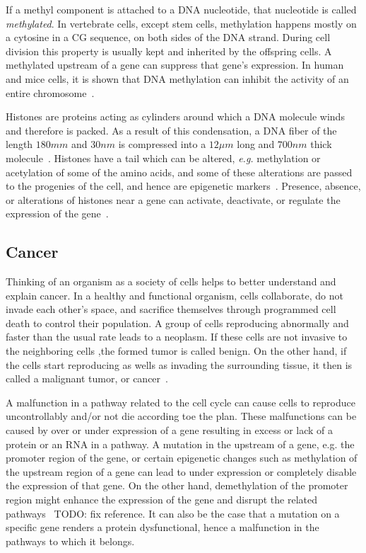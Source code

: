 If a methyl component is attached to a DNA nucleotide, that nucleotide is called \emph{methylated}. In vertebrate cells, except stem cells, methylation happens mostly on a cytosine in a CG sequence, on both sides of the DNA strand. During cell division this property is usually kept and inherited by the offspring cells. A methylated upstream of a gene can suppress that gene's expression. In human and mice cells, it is shown that DNA methylation can inhibit the activity of an entire chromosome~\cite[Ch. 7]{the-cell}.

Histones are proteins acting as cylinders around which a DNA molecule winds and therefore is packed. As a result of this condensation, a DNA fiber of the length $180mm$ and $30nm$ is compressed into a $12\mu m$ long and $700nm$ thick molecule~\cite{redon2002histone}. Histones have a tail which can be altered, \emph{e.g.} methylation or acetylation of some of the amino acids, and some of these alterations are passed to the progenies of the cell, and hence are epigenetic markers~\cite{turner2000histone, berger2009operational, moazed2011mechanisms}. Presence, absence, or alterations of histones near a gene can activate, deactivate, or regulate the expression of the gene~\cite{turner2000histone}.

\subsection{Cancer}
\label{sec:bkg:cancer}
Thinking of an organism as a society of cells helps to better understand and explain cancer. In a healthy and functional organism, cells collaborate, do not invade each other's space, and sacrifice themselves through programmed cell death to control their population. A group of cells reproducing abnormally and faster than the usual rate leads to a neoplasm. If these cells are not invasive to the neighboring cells ,the formed tumor is called benign. On the other hand, if the cells start reproducing as wells as invading the surrounding tissue, it then is called a malignant tumor, or cancer~\cite[Ch. 20]{the-cell}.

A malfunction in a pathway related to the cell cycle can cause cells to reproduce uncontrollably and/or not die according toe the plan. These malfunctions can be caused by over or under expression of a gene resulting in excess or lack of a protein or an RNA in a pathway. A mutation in the upstream of a gene, e.g. the promoter region of the gene, or certain epigenetic changes such as methylation of the upstream region of a gene can lead to under expression or completely disable the expression of that gene. On the other hand, demethylation of the promoter region might enhance the expression of the gene and disrupt the related pathways~\cite{methylation-cancer} TODO: fix reference. It can also be the case that a mutation on a specific gene renders a protein dysfunctional, hence a malfunction in the pathways to which it belongs.

